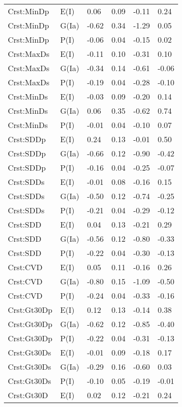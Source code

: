 \begin{center}
\begin{longtable}{|p{1.1in}|p{0.7in}|p{0.7in}|p{0.6in}|p{0.6in}|p{0.6in}|}
  Crst:MinDp & E(I) & 0.06 & 0.09 & -0.11 & 0.24 \\ 
  Crst:MinDp & G(Ia) & -0.62 & 0.34 & -1.29 & 0.05 \\ 
  Crst:MinDp & P(I) & -0.06 & 0.04 & -0.15 & 0.02 \\ 
  Crst:MaxDs & E(I) & -0.11 & 0.10 & -0.31 & 0.10 \\ 
  Crst:MaxDs & G(Ia) & -0.34 & 0.14 & -0.61 & -0.06 \\ 
  Crst:MaxDs & P(I) & -0.19 & 0.04 & -0.28 & -0.10 \\ 
  Crst:MinDs & E(I) & -0.03 & 0.09 & -0.20 & 0.14 \\ 
  Crst:MinDs & G(Ia) & 0.06 & 0.35 & -0.62 & 0.74 \\ 
  Crst:MinDs & P(I) & -0.01 & 0.04 & -0.10 & 0.07 \\ 
  Crst:SDDp & E(I) & 0.24 & 0.13 & -0.01 & 0.50 \\ 
  Crst:SDDp & G(Ia) & -0.66 & 0.12 & -0.90 & -0.42 \\ 
  Crst:SDDp & P(I) & -0.16 & 0.04 & -0.25 & -0.07 \\ 
  Crst:SDDs & E(I) & -0.01 & 0.08 & -0.16 & 0.15 \\ 
  Crst:SDDs & G(Ia) & -0.50 & 0.12 & -0.74 & -0.25 \\ 
  Crst:SDDs & P(I) & -0.21 & 0.04 & -0.29 & -0.12 \\ 
  Crst:SDD & E(I) & 0.04 & 0.13 & -0.21 & 0.29 \\ 
  Crst:SDD & G(Ia) & -0.56 & 0.12 & -0.80 & -0.33 \\ 
  Crst:SDD & P(I) & -0.22 & 0.04 & -0.30 & -0.13 \\ 
  Crst:CVD & E(I) & 0.05 & 0.11 & -0.16 & 0.26 \\ 
  Crst:CVD & G(Ia) & -0.80 & 0.15 & -1.09 & -0.50 \\ 
  Crst:CVD & P(I) & -0.24 & 0.04 & -0.33 & -0.16 \\ 
  Crst:Gt30Dp & E(I) & 0.12 & 0.13 & -0.14 & 0.38 \\ 
  Crst:Gt30Dp & G(Ia) & -0.62 & 0.12 & -0.85 & -0.40 \\ 
  Crst:Gt30Dp & P(I) & -0.22 & 0.04 & -0.31 & -0.13 \\ 
  Crst:Gt30Ds & E(I) & -0.01 & 0.09 & -0.18 & 0.17 \\ 
  Crst:Gt30Ds & G(Ia) & -0.29 & 0.16 & -0.60 & 0.03 \\ 
  Crst:Gt30Ds & P(I) & -0.10 & 0.05 & -0.19 & -0.01 \\ 
  Crst:Gt30D & E(I) & 0.02 & 0.12 & -0.21 & 0.24 \\ 

\end{longtable}
\end{center}
